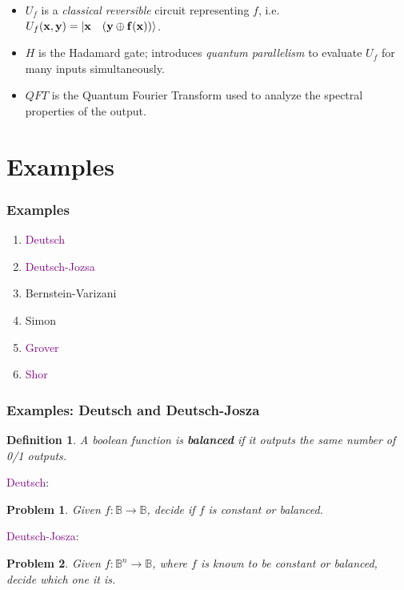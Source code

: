 \documentclass{beamer}
\newcommand{\Bool}{\ensuremath{\mathbb{B}}}
\newtheorem{defn}{Definition}
\newtheorem{prob}{Problem}
\newcommand{\pub}[1]{\textcolor{purple}{#1}}
\begin{document}
\begin{frame}
\begin{overprint}
\end{overprint}
\begin{itemize}
\item $U_f$ is a \emph{classical reversible} circuit representing $f$, i.e.
  $U_f(\mathbf{x},\mathbf{y}) = \ket{\mathbf{x} \quad(\mathbf{y \oplus f(x)})}$.
\item $H$ is the Hadamard gate; introduces \emph{quantum
    parallelism} to evaluate $U_f$ for many inputs simultaneously.
\item $\mathit{QFT}$ is the Quantum Fourier Transform used to analyze
  the spectral properties of the output.  
\end{itemize}
\end{frame}


\section[Examples]{Examples}


\begin{frame}

\frametitle{Examples}

\begin{enumerate}
  \item \textcolor<2->{purple}{Deutsch}
  \item \textcolor<2->{purple}{Deutsch-Jozsa}
  \item Bernstein-Varizani
  \item Simon
  \item \textcolor<2->{purple}{Grover}
  \item \textcolor<2->{purple}{Shor}
\end{enumerate}

\end{frame}

\begin{frame}
\frametitle{Examples: Deutsch and Deutsch-Josza}

\begin{defn}
  A boolean function is \textbf{balanced} if it outputs the same number of
  0/1 outputs.
\end{defn}
  \vspace*{8mm}

  \pub{Deutsch}:
  \begin{prob}
Given $f : \Bool\rightarrow\Bool$, decide if $f$ is 
\emph{constant} or \emph{balanced}.
  \end{prob}

  \vspace*{3mm}
  \pub{Deutsch-Josza}:
  \begin{prob}Given $f : \Bool^n\rightarrow\Bool$, where $f$ is known to be
\emph{constant} or \emph{balanced}, decide which one it is.
  \end{prob}
\end{frame}
\end{document}
